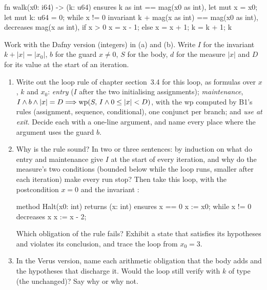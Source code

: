 \documentclass[11pt]{article}
\begin{document}
\begin{problem}
\begin{veruscode}
fn walk(x0: i64) -> (k: u64)
    ensures
        k as int == mag(x0 as int),
{
    let mut x = x0;
    let mut k: u64 = 0;
    while x != 0
        invariant
            k + mag(x as int) == mag(x0 as int),
        decreases mag(x as int),
    {
        if x > 0 {
            x = x - 1;
        } else {
            x = x + 1;
        }
        k = k + 1;
    }
    k
}
\end{veruscode}
Work with the Dafny version (integers) in (a) and (b). Write $I$ for the
invariant $k + \lvert x\rvert = \lvert x_0\rvert$, $b$ for the guard
$x \neq 0$, $S$ for the body, $d$ for the measure $\lvert x\rvert$ and $D$ for
its value at the start of an iteration.
\begin{enumerate}
\item[(a)] Write out the loop rule of chapter section~3.4 for this loop, as
  formulas over $x$, $k$ and $x_0$: \emph{entry} ($I$ after the two
  initialising assignments); \emph{maintenance},
  $I \wedge b \wedge \lvert x\rvert = D \Longrightarrow \mathrm{wp}(S,\,I \wedge 0 \leq \lvert
  x\rvert < D)$, with the wp computed by B1's rules (assignment, sequence,
  conditional), one conjunct per branch; and \emph{use at exit}. Decide each
  with a one-line argument, and name every place where the argument uses the
  guard $b$.
\item[(b)] Why is the rule sound? In two or three sentences: by induction on
  what do entry and maintenance give $I$ at the start of every iteration, and
  why do the measure's two conditions (bounded below while the loop runs,
  smaller after each iteration) make every run stop? Then take this loop, with
  the postcondition $x = 0$ and the invariant :
\begin{dafnycode}
method Halt(x0: int) returns (x: int)
  ensures x == 0
{
  x := x0;
  while x != 0
    decreases x
  {
    x := x - 2;
  }
}
\end{dafnycode}
  Which obligation of the rule fails? Exhibit a state that satisfies its
  hypotheses and violates its conclusion, and trace the loop from $x_0 = 3$.
\item[(c)] In the Verus version, name each arithmetic obligation that the body
  adds and the hypotheses that discharge it. Would the loop still verify with
  $k$ of type  (the  unchanged)? Say why or why not.
\end{enumerate}
\end{problem}
\end{document}
